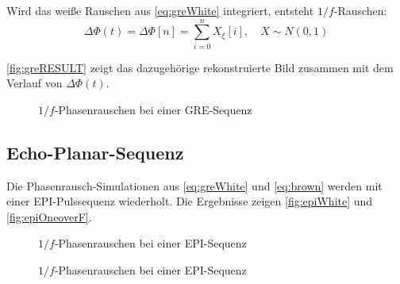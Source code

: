 Wird das weiße Rauschen aus \autoref{eq:greWhite} integriert, entsteht $1/f$-Rauschen:
\begin{equation}
	\label{eq:brown}
	\Delta \Phi(t)=\Delta \Phi[n]= \sum_{i=0}^{n} X_{\xi}[i], \quad X \sim N(0,1)
\end{equation} 

\autoref{fig:greRESULT} zeigt das dazugehörige rekonstruierte Bild zusammen mit dem Verlauf von $\Delta \Phi(t)$.

\begin{figure}[H]
	\centering
	\hfill
	\caption{$1/f$-Phasenrauschen bei einer GRE-Sequenz}
	\label{fig:greRESULT}	
\end{figure}

\subsection{Echo-Planar-Sequenz}

Die Phasenrausch-Simulationen aus \autoref{eq:greWhite} und \autoref{eq:brown} werden mit einer EPI-Pulssequenz wiederholt. Die Ergebnisse zeigen \autoref{fig:epiWhite} und \autoref{fig:epiOneoverF}.

\begin{figure}[H]
	\centering
	\hfill
	
	\caption{$1/f$-Phasenrauschen bei einer EPI-Sequenz}
	\label{fig:epiWhite}	
\end{figure}

\begin{figure}[H]
	\centering
	\hfill
	
	\caption{$1/f$-Phasenrauschen bei einer EPI-Sequenz}
	\label{fig:epiOneoverF}	
\end{figure}

